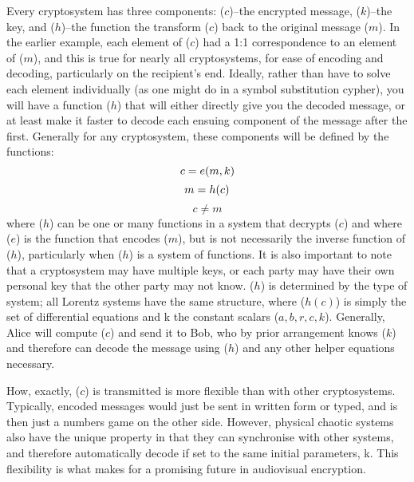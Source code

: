 Every cryptosystem has three components: ($c$)--the encrypted message, ($k$)--the key, and ($h$)--the function the transform ($c$) back to the original message ($m$).  In the earlier example, each element of ($c$) had a 1:1 correspondence to an element of ($m$), and this is true for nearly all cryptosystems, for ease of encoding and decoding, particularly on the recipient's end.  Ideally, rather than have to solve each element individually (as one might do in a symbol substitution cypher), you will have a function ($h$) that will either directly give you the decoded message, or at least make it faster to decode each ensuing component of the message after the first.  Generally for any cryptosystem, these components will be defined by the functions:
%
\begin{equation}
    c = e ( m , k ) \\
\end{equation}
\begin{equation}
    m = h ( c ) \\
\end{equation}
\begin{equation}
    c \neq m   
\end{equation}
%
where ($h$) can be one or many functions in a system that decrypts ($c$) and where ($e$) is the function that encodes ($m$), but is not necessarily the inverse function of ($h$), particularly when ($h$) is a system of functions.  It is also important to note that a cryptosystem may have multiple keys, or each party may have their own personal key that the other party may not know.  ($h$) is determined by the type of system; all Lorentz systems have the same structure, where ($h(c)$) is simply the set of differential equations and k the constant scalars ($a, b, r, c, k$).  Generally, Alice will compute ($c$) and send it to Bob, who by prior arrangement knows ($k$) and therefore can decode the message using ($h$) and any other helper equations necessary.

How, exactly, ($c$) is transmitted is more flexible than with other cryptosystems.  Typically, encoded messages would just be sent in written form or typed, and is then just a numbers game on the other side.  However, physical chaotic systems also have the unique property in that they can synchronise with other systems, and therefore automatically decode if set to the same initial parameters, k.  This flexibility is what makes for a promising future in audiovisual encryption.







